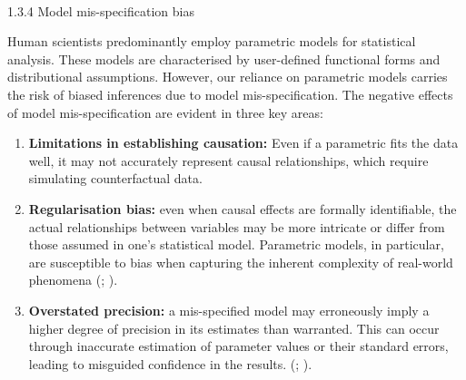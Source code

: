 \documentclass[
  singlecolumn]{article}
\makeatletter
\let\oldparagraph\paragraph
\renewcommand{\paragraph}{
    \@ifstar
      \xxxParagraphStar
      \xxxParagraphNoStar
  }
\newcommand{\xxxParagraphStar}[1]{\oldparagraph*{#1}\mbox{}}
\newcommand{\xxxParagraphNoStar}[1]{\oldparagraph{#1}\mbox{}}
\makeatother
\begin{document}
\paragraph{1.3.4 Model mis-specification
bias}\label{model-mis-specification-bias}

Human scientists predominantly employ parametric models for statistical
analysis. These models are characterised by user-defined functional
forms and distributional assumptions. However, our reliance on
parametric models carries the risk of biased inferences due to model
mis-specification. The negative effects of model mis-specification are
evident in three key areas:

\begin{enumerate}
\def\labelenumi{\arabic{enumi}.}
\item
  \textbf{Limitations in establishing causation:} Even if a parametric
  fits the data well, it may not accurately represent causal
  relationships, which require simulating counterfactual data.
\item
  \textbf{Regularisation bias:} even when causal effects are formally
  identifiable, the actual relationships between variables may be more
  intricate or differ from those assumed in one's statistical model.
  Parametric models, in particular, are susceptible to bias when
  capturing the inherent complexity of real-world phenomena
  (;
  ).
\item
  \textbf{Overstated precision:} a mis-specified model may erroneously
  imply a higher degree of precision in its estimates than warranted.
  This can occur through inaccurate estimation of parameter values or
  their standard errors, leading to misguided confidence in the results.
  (;
  ).
\end{enumerate}
\end{document}
